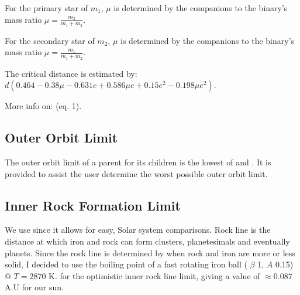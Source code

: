 \documentclass[letterpaper,10pt,english]{sphinxmanual}
\begin{document}
\sphinxAtStartPar
For the primary star of {\hyperref[\detokenize{quantities/material/mass:id1}]{}} \(m_1\), \(\mu\) is determined
by the companions to the binary’s mass ratio \(\mu = \frac{m_2}{m_1 + m_2}\).

\sphinxAtStartPar
For the secondary star of {\hyperref[\detokenize{quantities/material/mass:id1}]{}} \(m_2\), \(\mu\) is determined
by the companions to the binary’s mass ratio \(\mu = \frac{m_1}{m_1 + m_2}\).

\sphinxAtStartPar
The critical distance is estimated by: \(d (0.464 - 0.38 \mu - 0.631 e + 0.586 \mu e + 0.15 e^2 - 0.198 \mu e^2)\).

\sphinxAtStartPar
More info on:  (eq. 1).


\subsection{Outer Orbit Limit}
\label{\detokenize{quantities/children_orbit_limits/outer_orbit_limit:outer-orbit-limit}}\label{\detokenize{quantities/children_orbit_limits/outer_orbit_limit::doc}}\label{\detokenize{quantities/children_orbit_limits/outer_orbit_limit:id1}}
\sphinxAtStartPar
The outer orbit limit of a parent for its children is the lowest of
{\hyperref[\detokenize{quantities/children_orbit_limits/hill_sphere:id1}]{}} and {\hyperref[\detokenize{quantities/children_orbit_limits/s_type_critical_orbit:s-type-critical-orbit}]{}}.
It is provided to assist the user determine the worst possible outer orbit limit.


\subsection{Inner Rock Formation Limit}
\label{\detokenize{quantities/children_orbit_limits/inner_rock_formation_limit:inner-rock-formation-limit}}\label{\detokenize{quantities/children_orbit_limits/inner_rock_formation_limit::doc}}\label{\detokenize{quantities/children_orbit_limits/inner_rock_formation_limit:id1}}
\sphinxAtStartPar
We use {\hyperref[\detokenize{quantities/insolation_models/selsis/selsis:selsis-insolation-model}]{}} since it allows for easy, Solar system comparisons.
Rock line is the distance at which iron and rock can form clusters, planetesimals and eventually planets.
Since the rock line is determined by when rock and iron are more or less solid, I decided to use
the boiling point of a fast rotating iron ball
({\hyperref[\detokenize{quantities/surface/emission/heat_distribution:id1}]{}} \(\beta\) 1, {\hyperref[\detokenize{quantities/surface/emission/albedo:id1}]{}} \(A\) 0.15)
@ \(T = 2870\) K.
for the optimistic inner rock line limit, giving a value of \(\approx 0.087\) A.U for our sun.
\end{document}
